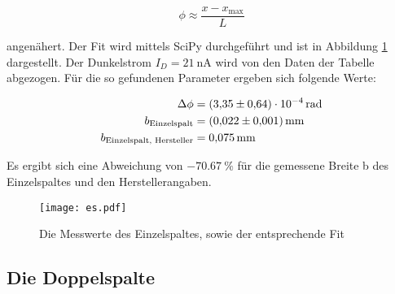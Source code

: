 \begin{equation}
  \phi \approx \frac{x - x_{\text{max}}}{L}
\end{equation}

angenähert.
Der Fit wird mittels SciPy durchgeführt und ist in Abbildung \ref{fig:Einzelspalt} dargestellt.
Der Dunkelstrom $I_D = \SI{21}{\nano\ampere}$ wird von den Daten der Tabelle abgezogen.
Für die so gefundenen Parameter ergeben sich folgende Werte:

\begin{align*}
  \Delta \phi &= \SI{3.35 \pm 0.64e-4}{\radian} \\
  b_{\text{Einzelspalt}} &= \SI{0.022 \pm 0.001}{\milli\metre} \\
  b_{\text{Einzelspalt, Hersteller}} &= \SI{0.075}{\milli\metre}
\end{align*}

Es ergibt sich eine Abweichung von $\SI{-70.67}{\percent}$ für die gemessene Breite b des Einzelspaltes und den Herstellerangaben.

\begin{figure}
  \centering
  \texttt{[image: es.pdf]}
  \caption{Die Messwerte des Einzelspaltes, sowie der entsprechende Fit}
  \label{fig:Einzelspalt}
\end{figure}

\subsection{Die Doppelspalte}

